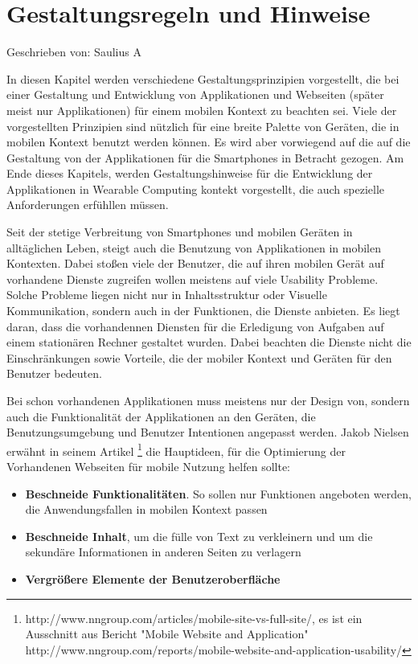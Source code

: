 
\section{Gestaltungsregeln und Hinweise}

Geschrieben von: Saulius A

In diesen Kapitel werden verschiedene Gestaltungsprinzipien vorgestellt, die bei einer Gestaltung und Entwicklung von Applikationen und Webseiten (später meist nur Applikationen) für einem mobilen Kontext zu beachten sei. Viele der vorgestellten Prinzipien sind nützlich für eine breite Palette von Geräten, die in mobilen Kontext benutzt werden können. Es wird aber vorwiegend auf die auf die Gestaltung von der Applikationen für die Smartphones in Betracht gezogen. Am Ende dieses Kapitels, werden Gestaltungshinweise für die Entwicklung der Applikationen in Wearable Computing kontekt vorgestellt, die auch spezielle Anforderungen erfühllen müssen.

Seit der stetige Verbreitung von Smartphones und mobilen Geräten in alltäglichen Leben, steigt auch die Benutzung von Applikationen in mobilen Kontexten. Dabei stoßen viele der Benutzer, die auf ihren mobilen Gerät auf vorhandene Dienste zugreifen wollen meistens auf viele Usability Probleme. Solche Probleme liegen nicht nur in Inhaltsstruktur oder Visuelle Kommunikation, sondern auch in der Funktionen, die Dienste anbieten. Es liegt daran, dass die vorhandennen Diensten für die Erledigung von Aufgaben auf einem stationären Rechner gestaltet wurden. Dabei beachten die Dienste nicht die Einschränkungen sowie Vorteile, die der mobiler Kontext und Geräten für den Benutzer bedeuten.

Bei schon vorhandenen Applikationen muss meistens nur der Design von, sondern auch die Funktionalität der Applikationen an den Geräten, die Benutzungsumgebung und Benutzer Intentionen angepasst werden. Jakob Nielsen erwähnt in seinem Artikel \footnote{http://www.nngroup.com/articles/mobile-site-vs-full-site/, es ist ein Ausschnitt aus Bericht "Mobile Website and Application" http://www.nngroup.com/reports/mobile-website-and-application-usability/} die Hauptideen, für die Optimierung der Vorhandenen Webseiten für mobile Nutzung helfen sollte:
\begin{itemize}
	\item \textbf{Beschneide Funktionalitäten}. So sollen nur Funktionen angeboten werden, die Anwendungsfallen in  mobilen Kontext passen
	\item \textbf{Beschneide Inhalt}, um die fülle von Text zu verkleinern und um die sekundäre Informationen in anderen Seiten zu verlagern
	\item \textbf{Vergrößere Elemente der Benutzeroberfläche}
\end{itemize}

